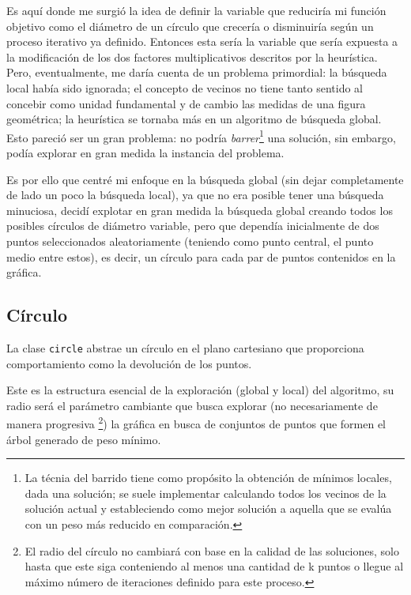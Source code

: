 \documentclass[a4paper]{report}
\begin{document}
  Es aqu\'i donde me surgi\'o la idea de definir la variable que reducir\'ia mi funci\'on objetivo como
  el di\'ametro de un c\'irculo que crecer\'ia o disminuir\'ia seg\'un un proceso iterativo ya definido.
  Entonces esta ser\'ia la variable que ser\'ia expuesta a la modificaci\'on de los dos factores
  multiplicativos descritos por la heur\'istica. Pero, eventualmente, me dar\'ia cuenta de un problema
  primordial: la b\'usqueda local hab\'ia sido ignorada; el concepto de vecinos no tiene tanto sentido
  al concebir como unidad fundamental y de cambio las medidas de una figura geom\'etrica; la heur\'istica
  se tornaba m\'as en un algoritmo de b\'usqueda global. Esto pareci\'o ser un gran problema:
  no podr\'ia \textit{barrer}\footnote{La t\'ecnia del barrido tiene como prop\'osito la obtenci\'on
    de m\'inimos locales, dada una soluci\'on; se suele implementar calculando todos los vecinos de
    la soluci\'on actual y estableciendo como mejor soluci\'on a aquella que se eval\'ua con un peso
    m\'as reducido en comparaci\'on.} una soluci\'on, sin embargo, pod\'ia explorar en gran medida
  la instancia del problema.

  Es por ello que centr\'e mi enfoque en la b\'usqueda global (sin dejar completamente de lado un
  poco la b\'usqueda local), ya que no era posible tener una b\'usqueda minuciosa, decid\'i explotar
  en gran medida la b\'usqueda global creando todos los posibles  c\'irculos de di\'ametro variable,
  pero que depend\'ia inicialmente de dos puntos seleccionados aleatoriamente (teniendo como punto
  central, el punto medio entre estos), es decir, un c\'irculo para cada par de puntos contenidos
  en la gr\'afica.

  \subsection{Círculo}
  La clase \texttt{circle} abstrae un c\'irculo en el plano cartesiano que proporciona
  comportamiento como la devoluci\'on de los puntos.

  Este es la estructura esencial de la exploraci\'on (global y local) del algoritmo, su radio ser\'a
  el par\'ametro cambiante que busca explorar (no necesariamente de manera progresiva
  \footnote{El radio del c\'irculo no cambiar\'a con base en la calidad de las soluciones,
    solo hasta que este siga conteniendo al menos una cantidad de k puntos o llegue al
    m\'aximo n\'umero de iteraciones definido para este proceso.}) la gr\'afica en busca de
  conjuntos de puntos que formen el \'arbol generado de peso m\'inimo.
\end{document}
